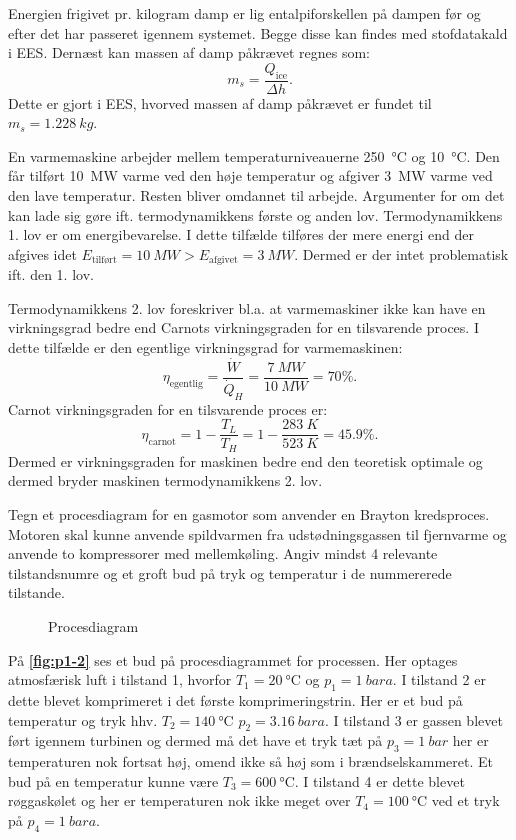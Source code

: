 \documentclass[a4paper]{article}
\begin{document}
Energien frigivet pr. kilogram damp er lig entalpiforskellen på dampen før og efter det har passeret igennem systemet. Begge disse kan findes med stofdatakald i EES. Dernæst kan massen af damp påkrævet regnes som:
\[ 
m_s = \frac{Q_{\mathrm{ice}}}{\Delta h}
.\]
Dette er gjort i EES, hvorved massen af damp påkrævet er fundet til $m_s = \qty{1,228}{kg}$. 


En varmemaskine arbejder mellem temperaturniveauerne \qty{250}{\celsius} og \qty{10}{\celsius}. Den får tilført \qty{10}{MW} varme ved den høje temperatur og afgiver \qty{3}{MW} varme ved den lave temperatur. Resten bliver omdannet til arbejde. Argumenter for om det kan lade sig gøre ift. termodynamikkens første og anden lov.
\bigbreak
Termodynamikkens 1. lov er om energibevarelse. I dette tilfælde tilføres der mere energi end der afgives idet $E_{\text{tilført}} = \qty{10}{MW} > E_{\text{afgivet}} = \qty{3}{MW}$. Dermed er der intet problematisk ift. den 1. lov.

Termodynamikkens 2. lov foreskriver bl.a. at varmemaskiner ikke kan have en virkningsgrad bedre end Carnots virkningsgraden for en tilsvarende proces. I dette tilfælde er den egentlige virkningsgrad for varmemaskinen:
\[ 
\eta_{\text{egentlig}} = \frac{\dot{W}}{\dot{Q}_H} = \frac{\qty{7}{MW}}{\qty{10}{MW}} = 70\%
.\]
Carnot virkningsgraden for en tilsvarende proces er:
\[ 
\eta_{\mathrm{carnot}} = 1 - \frac{T_L}{T_H} = 1 - \frac{\qty{283}{K}}{\qty{523}{K}} = \num{45,9}\%
.\]
Dermed er virkningsgraden for maskinen bedre end den teoretisk optimale og dermed bryder maskinen termodynamikkens 2. lov. 


Tegn et procesdiagram for en gasmotor som anvender en Brayton kredsproces. Motoren skal kunne anvende spildvarmen fra udstødningsgassen til fjernvarme og anvende to kompressorer med mellemkøling. Angiv mindst 4 relevante tilstandsnumre og et groft bud på tryk og temperatur i de nummererede tilstande.
\bigbreak
\begin{figure}[ht]
  \centering
  \caption{Procesdiagram}
  \label{fig:p1-2}
\end{figure}
På \textbf{\autoref{fig:p1-2}} ses et bud på procesdiagrammet for processen. Her optages atmosfærisk luft i tilstand 1, hvorfor $T_1 = \qty{20}{\celsius}$ og $p_1 = \qty{1}{bara}$. I tilstand 2 er dette blevet komprimeret i det første komprimeringstrin. Her er et bud på temperatur og tryk hhv. $T_2 = \qty{140}{\celsius}$ $p_2 = \qty{3,16}{bara} $. I tilstand 3 er gassen blevet ført igennem turbinen og dermed må det have et tryk tæt på $p_3 = \qty{1}{bar} $ her er temperaturen nok fortsat høj, omend ikke så høj som i brændselskammeret. Et bud på en temperatur kunne være $T_3 = \qty{600}{\celsius}$. I tilstand 4 er dette blevet røggaskølet og her er temperaturen nok ikke meget over $T_4 = \qty{100}{\celsius}$ ved et tryk på $p_4 = \qty{1}{bara}$.
\end{document}
